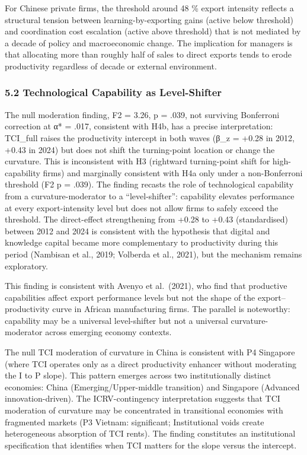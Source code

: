 \documentclass[
  12pt,a4paper]{article}
\begin{document}
For Chinese private firms, the threshold around 48 \% export intensity
reflects a structural tension between learning-by-exporting gains
(active below threshold) and coordination cost escalation (active above
threshold) that is not mediated by a decade of policy and macroeconomic
change. The implication for managers is that allocating more than
roughly half of sales to direct exports tends to erode productivity
regardless of decade or external environment.

\hypertarget{technological-capability-as-level-shifter}{%
\subsubsection{5.2 Technological Capability as
Level-Shifter}\label{technological-capability-as-level-shifter}}

The null moderation finding, F2 = 3.26, p = .039, not surviving
Bonferroni correction at α* = .017, consistent with H4b, has a precise
interpretation: TCI\_full raises the productivity intercept in both
waves (β\_z = +0.28 in 2012, +0.43 in 2024) but does not shift the
turning-point location or change the curvature. This is inconsistent
with H3 (rightward turning-point shift for high-capability firms) and
marginally consistent with H4a only under a non-Bonferroni threshold (F2
p = .039). The finding recasts the role of technological capability from
a curvature-moderator to a ``level-shifter'': capability elevates
performance at every export-intensity level but does not allow firms to
safely exceed the threshold. The direct-effect strengthening from +0.28
to +0.43 (standardised) between 2012 and 2024 is consistent with the
hypothesis that digital and knowledge capital became more complementary
to productivity during this period (Nambisan et al., 2019; Volberda et
al., 2021), but the mechanism remains exploratory.

This finding is consistent with Avenyo et al.~(2021), who find that
productive capabilities affect export performance levels but not the
shape of the export--productivity curve in African manufacturing firms.
The parallel is noteworthy: capability may be a universal level-shifter
but not a universal curvature-moderator across emerging economy
contexts.

The null TCI moderation of curvature in China is consistent with P4
Singapore (where TCI operates only as a direct productivity enhancer
without moderating the I to P slope). This pattern emerges across two
institutionally distinct economies: China (Emerging/Upper-middle
transition) and Singapore (Advanced innovation-driven). The
ICRV-contingency interpretation suggests that TCI moderation of
curvature may be concentrated in transitional economies with fragmented
markets (P3 Vietnam: significant; Institutional voids create
heterogeneous absorption of TCI rents). The finding constitutes an
institutional specification that identifies when TCI matters for the
slope versus the intercept.
\end{document}

